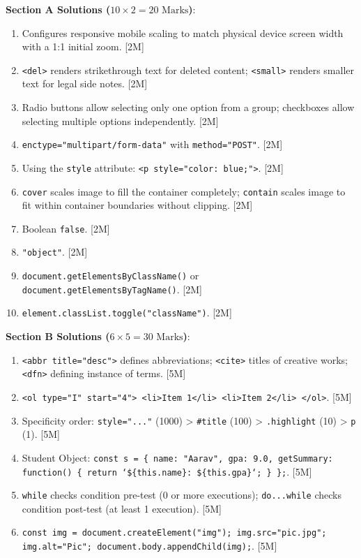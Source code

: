 \begin{solutionbox}
\noindent\textbf{Section A Solutions ($10 \times 2 = 20\text{ Marks}$)}:
\begin{enumerate}
    \item Configures responsive mobile scaling to match physical device screen width with a 1:1 initial zoom. [2M]
    \item \texttt{<del>} renders strikethrough text for deleted content; \texttt{<small>} renders smaller text for legal side notes. [2M]
    \item Radio buttons allow selecting only one option from a group; checkboxes allow selecting multiple options independently. [2M]
    \item \texttt{enctype="multipart/form-data"} with \texttt{method="POST"}. [2M]
    \item Using the \texttt{style} attribute: \texttt{<p style="color: blue;">}. [2M]
    \item \texttt{cover} scales image to fill the container completely; \texttt{contain} scales image to fit within container boundaries without clipping. [2M]
    \item Boolean \texttt{false}. [2M]
    \item \texttt{"object"}. [2M]
    \item \texttt{document.getElementsByClassName()} or \texttt{document.getElementsByTagName()}. [2M]
    \item \texttt{element.classList.toggle("className")}. [2M]
\end{enumerate}

\medskip
\noindent\textbf{Section B Solutions ($6 \times 5 = 30\text{ Marks}$)}:
\begin{enumerate}[start=11]
    \item \texttt{<abbr title="desc">} defines abbreviations; \texttt{<cite>} titles of creative works; \texttt{<dfn>} defining instance of terms. [5M]
    \item \texttt{<ol type="I" start="4"> <li>Item 1</li> <li>Item 2</li> </ol>}. [5M]
    \item Specificity order: \texttt{style="..."} (1000) > \texttt{\#title} (100) > \texttt{.highlight} (10) > \texttt{p} (1). [5M]
    \item Student Object: \texttt{const s = \{ name: "Aarav", gpa: 9.0, getSummary: function() \{ return `\$\{this.name\}: \$\{this.gpa\}`; \} \};}. [5M]
    \item \texttt{while} checks condition pre-test (0 or more executions); \texttt{do...while} checks condition post-test (at least 1 execution). [5M]
    \item \texttt{const img = document.createElement("img"); img.src="pic.jpg"; img.alt="Pic"; document.body.appendChild(img);}. [5M]
\end{enumerate}


\end{solutionbox}
